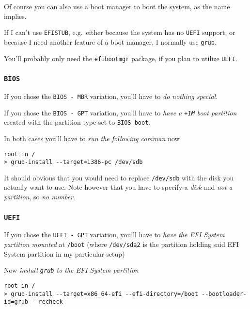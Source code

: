 \documentclass[10pt]{dustdoc}
\begin{document}
Of course you can also use a boot manager to boot the system, as the name implies.

If I can't use \texttt{EFISTUB}, e.g.\ either because the system has no \texttt{UEFI} support, or because I need another feature of a boot manager, I normally use \texttt{grub}.

\begin{NOTE}
    You'll probably only need the \texttt{efibootmgr} package, if you plan to utilize \texttt{UEFI}.
\end{NOTE}

\subsubsection{\texttt{BIOS}}%
\label{sec:bios}

If you chose the \texttt{BIOS -\ MBR} variation, you’ll have to \emph{do nothing special}.

If you chose the \texttt{BIOS -\ GPT} variation, you’ll have to \emph{have a \texttt{+1M} boot partition} created with the partition type set to \texttt{BIOS boot}.

In both cases you’ll have to \emph{run the following comman} now

\begin{verbatim}
root in /
> grub-install --target=i386-pc /dev/sdb
\end{verbatim}

\begin{NOTE}
    It should obvious that you would need to replace \texttt{/dev/sdb} with the disk you actually want to use.
    Note however that you have to specify a \emph{disk} and \emph{not a partition}, so \emph{no number}.
\end{NOTE}

\subsubsection{\texttt{UEFI}}%
\label{sec:uefi}

If you chose the \texttt{UEFI -\ GPT} variation, you’ll have to \emph{have the EFI System partition mounted} at \texttt{/boot} (where \texttt{/dev/sda2} is the partition holding said EFI System partition in my particular setup)

Now \emph{install \texttt{grub} to the EFI System partition}

\begin{verbatim}
root in /
> grub-install --target=x86_64-efi --efi-directory=/boot --bootloader-id=grub --recheck
\end{verbatim}
\end{document}
